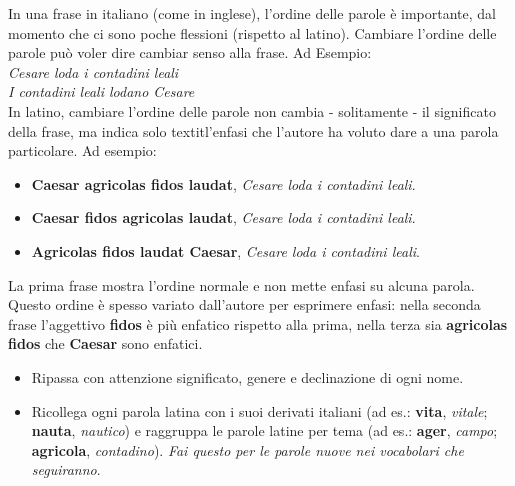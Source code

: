 \documentclass[nols]{tufte-handout}
\newcommand{\textls}[2][5]{%
    \begingroup\addfontfeatures{LetterSpace=#1}#2\endgroup
  }
\renewcommand{\smallcapsspacing}[1]{\textls[10]{#1}}
\renewcommand{\textsc}[1]{\smallcapsspacing{\textsmallcaps{#1}}}
\begin{document}
 In una frase in italiano (come in inglese), l'ordine delle parole è importante, 
dal momento che ci sono poche flessioni (rispetto al latino). Cambiare l'ordine delle parole può voler dire cambiar senso alla frase.
Ad Esempio:
\\
\textit{Cesare loda i contadini leali} \\
\textit{I contadini leali lodano Cesare} \\
In latino, cambiare l'ordine delle parole non cambia - solitamente - il significato della frase, ma indica solo textit{l'enfasi} che l'autore
ha voluto dare a una parola particolare. Ad esempio:
\begin{itemize}
\item[\textsc{1.}] \textbf{Caesar agricolas fidos laudat}, \textit{Cesare loda i contadini leali}.  
\item[\textsc{1.}] \textbf{Caesar fidos agricolas laudat}, \textit{Cesare loda i contadini leali}.  
\item[\textsc{1.}] \textbf{Agricolas fidos laudat Caesar}, \textit{Cesare loda i contadini leali}.  
\end{itemize}
La prima frase mostra l'ordine normale  e non mette enfasi su alcuna parola. Questo ordine è spesso variato dall'autore per esprimere enfasi: 
nella seconda frase l'aggettivo \textbf{fidos} è più enfatico rispetto alla prima, nella terza sia \textbf{agricolas fidos} che \textbf{Caesar} sono enfatici.

\begin{itemize}
\item[\textsc{1.}] Ripassa con attenzione significato, genere e declinazione di ogni nome.  
\item[\textsc{2.}] Ricollega ogni parola latina con i suoi derivati italiani (ad es.: \textbf{vita}, \textit{vitale}; \textbf{nauta}, \textit{nautico}) e raggruppa le parole latine per tema (ad es.: \textbf{ager}, \textit{campo}; \textbf{agricola}, \textit{contadino}). \textit{Fai questo per le parole nuove nei vocabolari che seguiranno}. 
\end{itemize}
\end{document}
